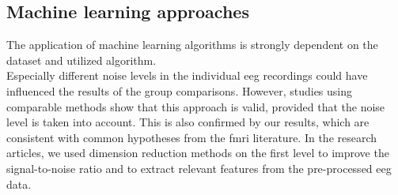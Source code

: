 \subsection{Machine learning approaches}
The application of machine learning algorithms is strongly dependent on the dataset and utilized algorithm.\\
Especially different noise levels in the individual \gls{eeg} recordings could have influenced the results of the group comparisons. However, studies using comparable methods show that this approach is valid, provided that the noise level is taken into account. This is also confirmed by our results, which are consistent with common hypotheses from the \gls{fmri} literature. In the research articles, we used dimension reduction methods on the first level to improve the signal-to-noise ratio and to extract relevant features from the pre-processed \gls{eeg} data.\\
